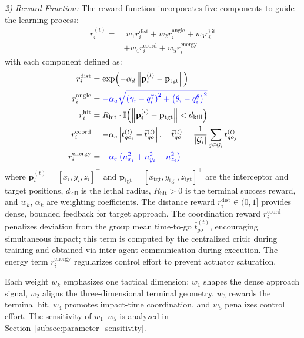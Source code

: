 \documentclass[lettersize,journal]{IEEEtran}
\newcommand{\hladd}[1]{{\color{blue}#1}}
\begin{document}
\emph{2) Reward Function:} The reward function incorporates five components to guide the learning process:
\begin{equation}
\label{eq:reward_function}
\begin{split}
r_i^{(t)} =& \; w_1 r_i^{\text{dist}} + w_2 r_i^{\text{angle}} + w_3 r_i^{\text{hit}} \\
&+ w_4 r_i^{\text{coord}} + w_5 r_i^{\text{energy}}
\end{split}
\end{equation}
with each component defined as:
\begin{align}
r_i^{\text{dist}} &= \exp\!\left(-\alpha_d \left\|\mathbf{p}_i^{(t)} - \mathbf{p}_{\text{tgt}}\right\|\right) \label{eq:r_dist}\\
r_i^{\text{angle}} &= \hladd{-\alpha_a\sqrt{\left(\gamma_i-q_i^{\gamma}\right)^2+\left(\theta_i-q_i^{\theta}\right)^2}} \label{eq:r_angle}\\
r_i^{\text{hit}} &= R_{\text{hit}} \cdot \mathbb{I}\!\left(\left\|\mathbf{p}_i^{(t)} - \mathbf{p}_{\text{tgt}}\right\| < d_{\text{kill}}\right) \label{eq:r_hit}\\
r_i^{\text{coord}} &= -\alpha_c \left| t_{go_i}^{(t)} - \bar{t}_{go}^{(t)} \right|, \quad \bar{t}_{go}^{(t)} = \frac{1}{|\mathcal{G}_i|}\sum_{j \in \mathcal{G}_i} t_{go_j}^{(t)} \label{eq:r_coord}\\
r_i^{\text{energy}} &= \hladd{-\alpha_e\left(n_{x_i}^2+n_{y_i}^2+n_{z_i}^2\right)} \label{eq:r_energy}
\end{align}
where $\mathbf{p}_i^{(t)}=[x_i,y_i,z_i]^\top$ and $\mathbf{p}_{\mathrm{tgt}}=[x_{\mathrm{tgt}},y_{\mathrm{tgt}},z_{\mathrm{tgt}}]^\top$ are the interceptor and target positions, $d_{\text{kill}}$ is the lethal radius, $R_{\text{hit}} > 0$ is the terminal success reward, and $w_k$, $\alpha_k$ are weighting coefficients. The distance reward $r_i^{\text{dist}} \in (0,1]$ provides dense, bounded feedback for target approach. The coordination reward $r_i^{\text{coord}}$ penalizes deviation from the group mean time-to-go $\bar{t}_{go}^{(t)}$, encouraging simultaneous impact; this term is computed by the centralized critic during training and obtained via inter-agent communication during execution. The energy term $r_i^{\text{energy}}$ regularizes control effort to prevent actuator saturation.

\hladd{Each weight $w_k$ emphasizes one tactical dimension: $w_1$ shapes the dense approach signal, $w_2$ aligns the three-dimensional terminal geometry, $w_3$ rewards the terminal hit, $w_4$ promotes impact-time coordination, and $w_5$ penalizes control effort. The sensitivity of $w_1$--$w_5$ is analyzed in Section~\ref{subsec:parameter_sensitivity}.}
\end{document}
